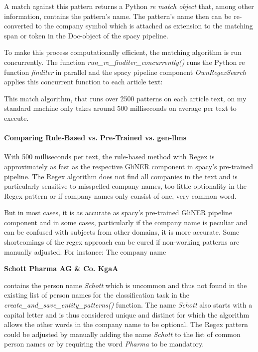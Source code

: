 A match against this pattern returns a Python \emph{re match object} that, among other information, contains the pattern’s name.
The pattern’s name then can be re-converted to the company symbol which is attached as extension to the matching \gls{span} or \gls{token} in the Doc-object of the spacy pipeline.

To make this process computationally efficient, the matching algorithm is run concurrently.
The function \emph{run\_re\_finditer\_concurrently()} runs the Python re function \emph{finditer} in parallel and the spacy pipeline component \emph{OwnRegexSearch} applies this concurrent function to each article text:



This match algorithm, that runs over 2500 patterns on each article text, on my standard machine only takes around 500 milliseconds on average per text to execute.

\paragraph{Comparing Rule-Based vs. Pre-Trained vs. \glspl{gen-llm}}
With 500 milliseconds per text, the rule-based method with \gls{Regex} is approximately as fast as the respective GliNER component in spacy’s pre-trained pipeline.
The \gls{Regex} algorithm does not find all companies in the text and is particularly sensitive to misspelled company names, too little optionality in the \gls{Regex} pattern or if company names only consist of one, very common word.


But in most cases, it is as accurate as spacy’s pre-trained GliNER pipeline component and in some cases, particularly if the company name is peculiar and can be confused with subjects from other domains, it is more accurate.
Some shortcomings of the regex approach can be cured if non-working patterns are manually adjusted.
For instance: The company name
\begin{center}
    \textbf{Schott Pharma AG \& Co. KgaA}
\end{center}
contains the person name \emph{Schott} which is uncommon and thus not found in the existing list of person names for the classification task in the \emph{create\_and\_save\_entity\_patterns()} function.
The name \emph{Schott} also starts with a capital letter and is thus considered unique and distinct for which the algorithm allows the other words in the company name to be optional.
The \gls{Regex} pattern could be adjusted by manually adding the name \emph{Schott} to the list of common person names or by requiring the word \emph{Pharma} to be mandatory.

